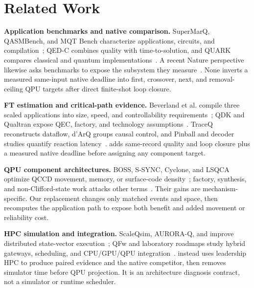 \section{Related Work}

\noindent\textbf{Application benchmarks and native comparison.}
SuperMarQ, QASMBench, and MQT Bench characterize applications, circuits, and compilation~\cite{supermarq,qasmbench,mqtbench}; QED-C combines quality with time-to-solution, and QUARK compares classical and quantum implementations~\cite{qedcbench,quark2022}. A recent Nature perspective likewise asks benchmarks to expose the subsystem they measure~\cite{proctor2025benchmarking}. None inverts a measured same-input native deadline into first, crossover, next, and removal-ceiling QPU targets after direct finite-shot loop closure.

\noindent\textbf{FT estimation and critical-path evidence.}
Beverland et al. compile three scaled applications into size, speed, and controllability requirements~\cite{beverland2022}; QDK and Qualtran expose QEC, factory, and technology assumptions~\cite{azureestimator,harrigan2024qualtran}. TraceQ reconstructs dataflow, d'ArQ groups causal control, and Pinball and decoder studies quantify reaction latency~\cite{traceq2026,darq2026,pinball2026,khalid2025reaction}. \SystemName adds same-record quality and loop closure plus a measured native deadline before assigning any component target.

\noindent\textbf{QPU component architectures.}
BOSS, S-SYNC, Cyclone, and LSQCA optimize QCCD movement, memory, or surface-code density~\cite{boss2025,ssync2025,cyclone2026,lsqca2025}; factory, synthesis, and non-Clifford-state work attacks other terms~\cite{hofmeyr2025puremagic,silva2024multilevelfactory,chatterjee2025qspellbook,campbell2017synthillation,choi2023postselectedrotation}. Their gains are mechanism-specific. Our replacement changes only matched events and space, then recomputes the application path to expose both benefit and added movement or reliability cost.

\noindent\textbf{HPC simulation and integration.}
ScaleQsim, AURORA-Q, and \cuQuantum improve distributed state-vector execution~\cite{scaleqsim,auroraq,cuquantum}; QFw and laboratory roadmaps study hybrid gateways, scheduling, and CPU/GPU/QPU integration~\cite{qfw2025,qfwsc25,ornlbridging2026,ornlhpcecosystem2024,nerscquantumroadmap2025}. \SystemName instead uses leadership HPC to produce paired evidence and the native competitor, then removes simulator time before QPU projection. It is an architecture diagnosis contract, not a simulator or runtime scheduler.
